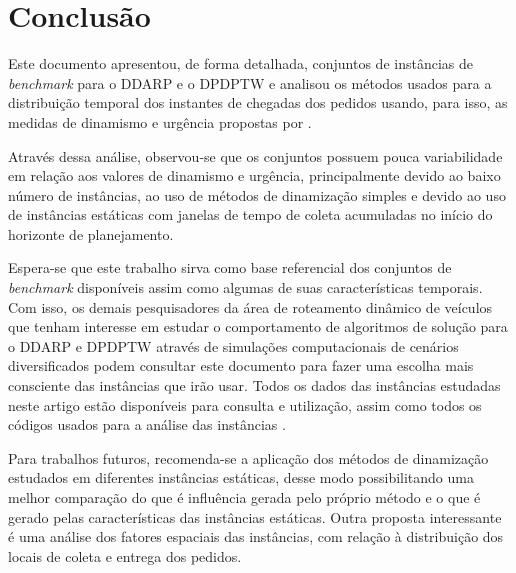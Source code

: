 \chapter{Conclusão}\label{ch:conclusao}


Este documento apresentou, de forma detalhada, conjuntos de instâncias de 
\textit{benchmark} para o DDARP e o DPDPTW e analisou os métodos usados para a 
distribuição temporal dos instantes de chegadas dos pedidos usando, para isso,
as medidas de dinamismo e urgência propostas por 
.

Através dessa análise, observou-se que os conjuntos possuem pouca 
variabilidade em relação aos valores de dinamismo e urgência, principalmente 
devido ao baixo número de instâncias, ao uso de métodos de dinamização simples 
e devido ao uso de instâncias estáticas com janelas de tempo de coleta
acumuladas no início do horizonte de planejamento.

Espera-se que este trabalho sirva como base referencial dos conjuntos de 
\textit{benchmark} disponíveis assim como algumas de suas características
temporais. 
Com isso, os demais pesquisadores da área de roteamento dinâmico de 
veículos que tenham interesse em estudar o comportamento de algoritmos de 
solução para o DDARP e DPDPTW através de simulações computacionais de cenários 
diversificados podem consultar este documento para fazer uma escolha mais
consciente das instâncias que irão usar.
Todos os dados das instâncias estudadas neste artigo estão disponíveis para 
consulta e utilização, assim como todos os códigos usados para a análise das 
instâncias \cite{eccel_problemas_2019}.

Para trabalhos futuros, recomenda-se a aplicação dos métodos de dinamização
estudados em diferentes instâncias estáticas, desse modo possibilitando uma
melhor comparação do que é influência gerada pelo próprio método e o que é 
gerado pelas características das instâncias estáticas.
Outra proposta interessante é uma análise dos fatores espaciais das 
instâncias, com relação à distribuição dos locais de coleta e entrega dos 
pedidos.
